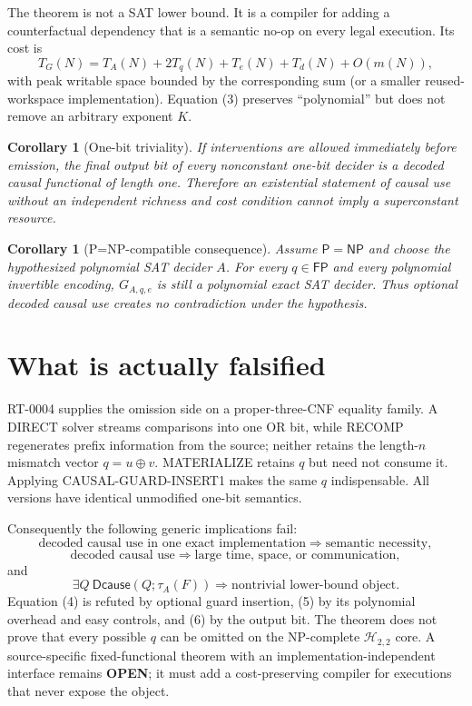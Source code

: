 \documentclass[11pt]{article}
\newtheorem{corollary}[theorem]{Corollary}
\newcommand{\Pclass}{\mathsf P}
\newcommand{\NPclass}{\mathsf{NP}}
\begin{document}
The theorem is not a SAT lower bound.  It is a compiler for adding a
counterfactual dependency that is a semantic no-op on every legal execution.
Its cost is
\[
 T_G(N)=T_A(N)+2T_q(N)+T_e(N)+T_d(N)+O(m(N)),              \tag{3}
\]
with peak writable space bounded by the corresponding sum (or a smaller
reused-workspace implementation).  Equation (3) preserves ``polynomial'' but
does not remove an arbitrary exponent $K$.

\begin{corollary}[One-bit triviality]
If interventions are allowed immediately before emission, the final output
bit of every nonconstant one-bit decider is a decoded causal functional of
length one.  Therefore an existential statement of causal use without an
independent richness and cost condition cannot imply a superconstant resource.
\end{corollary}

\begin{corollary}[P=NP-compatible consequence]
Assume $\Pclass=\NPclass$ and choose the hypothesized polynomial SAT decider
$A$.  For every $q\in\mathsf{FP}$ and every polynomial invertible encoding,
$G_{A,q,e}$ is still a polynomial exact SAT decider.  Thus optional decoded
causal use creates no contradiction under the hypothesis.
\end{corollary}

\section{What is actually falsified}
RT-0004 supplies the omission side on a proper-three-CNF equality family.  A
DIRECT solver streams comparisons into one OR bit, while RECOMP regenerates
prefix information from the source; neither retains the length-$n$ mismatch
vector $q=u\oplus v$.  MATERIALIZE retains $q$ but need not consume it.
Applying CAUSAL-GUARD-INSERT1 makes the same $q$ indispensable.  All versions
have identical unmodified one-bit semantics.

Consequently the following generic implications fail:
\[
 \text{decoded causal use in one exact implementation}
 \Longrightarrow \text{semantic necessity},              \tag{4}
\]
\[
 \text{decoded causal use}
 \Longrightarrow \text{large time, space, or communication},              \tag{5}
\]
and
\[
 \exists Q\ \mathsf{Dcause}(Q;\tau_A(F))
 \Longrightarrow \text{nontrivial lower-bound object}.    \tag{6}
\]
Equation (4) is refuted by optional guard insertion, (5) by its polynomial
overhead and easy controls, and (6) by the output bit.  The theorem does not
prove that every possible $q$ can be omitted on the NP-complete
$\mathcal H_{2,2}$ core.  A source-specific fixed-functional theorem with an
implementation-independent interface remains \textbf{OPEN}; it must add a
cost-preserving compiler for executions that never expose the object.
\end{document}
